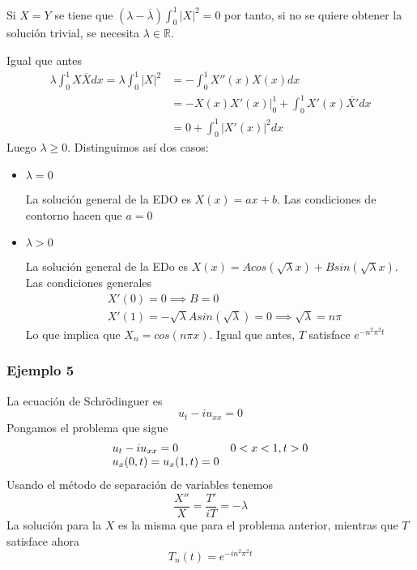 Si $X=Y$ se tiene que
$(\lambda - \overline{\lambda})\int_0^1|X|^2 = 0$
por tanto, si no se quiere obtener la solución trivial, se necesita $\lambda\in\mathbb{R}$.

\noindent Igual que antes
\begin{align*}
\lambda \int_0^1X\overline{X}dx = \lambda \int_0^1 |X|^2 & = -\int_0^1X''(x)X(x)dx\\
	& = \left.-X(x)X'(x)\right|_0^1 + \int_0^1X'(x)\overline{X'}dx\\
	& = 0 + \int_0^1|X'(x)|^2dx
\end{align*}
Luego $\lambda \ge 0$. Distinguimos así dos casos:

\begin{itemize}
\item $\lambda = 0$

La solución general de la EDO es $X(x) = ax+b$. Las condiciones de contorno hacen que $a=0$

\item $\lambda > 0$

La solución general de la EDo es $X(x) = Acos(\sqrt{\lambda}x)+Bsin(\sqrt{\lambda}x)$. 
Las condiciones generales
\begin{align*}
& X'(0) = 0 \implies B = 0\\
& X'(1) = -\sqrt{\lambda}Asin(\sqrt{\lambda})=0\implies \sqrt{\lambda}=n\pi
\end{align*}
Lo que implica que $X_n=cos(n\pi x)$.
Igual que antes, $T$ satisface $e^{-n^2\pi^2t}$
\end{itemize}

\subsubsection*{Ejemplo 5}
La ecuación de Schrödinguer es
$$u_t-iu_{xx}=0$$
Pongamos el problema que sigue
\begin{equation*}
\begin{array}{l l}
u_t-iu_{xx}=0 & 0<x<1, t>0\\
u_x(0,t)=u_x(1,t) = 0 & 
\end{array}
\end{equation*}
Usando el método de separación de variables tenemos
$$\frac{X''}{X}=\frac{T'}{iT}=-\lambda$$
La solución para la $X$ es la misma que para el problema anterior, mientras que $T$ satisface ahora
$$T_n(t) = e^{-in^2\pi^2t}$$